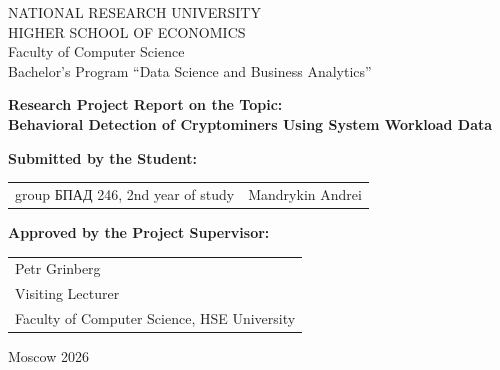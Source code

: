 \begin{titlepage}
\newpage

{
\begin{center}
NATIONAL RESEARCH UNIVERSITY\\
HIGHER SCHOOL OF ECONOMICS
\\
\bigskip
Faculty of Computer Science\\
Bachelor's Program ``Data Science and Business Analytics''
\end{center}
}

\vspace{3em}

\begin{center}
{\bf Research Project Report on the Topic:}\\
\vspace{1em}
{\bf Behavioral Detection of Cryptominers Using System Workload Data}
\end{center}

\vspace{3em}

{\bf Submitted by the Student: \vspace{2mm}}

{
\begin{tabular}{l@{\hskip 1.5cm}l}
group \foreignlanguage{russian}{БПАД} 246, 2nd year of study &
Mandrykin Andrei \\
\end{tabular}}

\vspace{2em}

{\bf Approved by the Project Supervisor: \vspace{2mm}}

{
\begin{tabular}{l}
Petr Grinberg\\
Visiting Lecturer\\
Faculty of Computer Science, HSE University
\end{tabular}}

\vspace{\fill}

\begin{center}
Moscow 2026
\end{center}

\end{titlepage}
